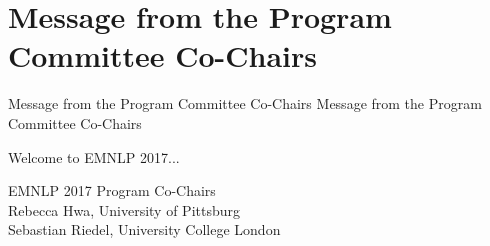 \section{Message from the Program Committee Co-Chairs}
\setheaders%
    {Message from the Program Committee Co-Chairs}%
    {Message from the Program Committee Co-Chairs}
\thispagestyle{emptyheader}

\setlength{\parskip}{.7ex}

Welcome to EMNLP 2017... 


\noindent EMNLP 2017 Program Co-Chairs \\
Rebecca Hwa, University of Pittsburg\\
Sebastian Riedel, University College London

